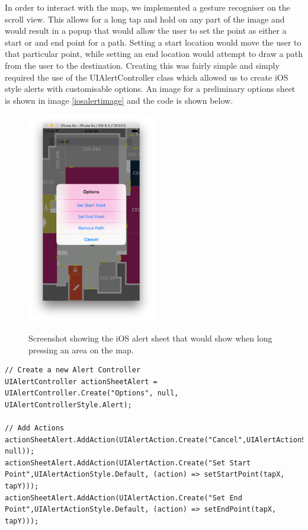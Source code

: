 \documentclass[main.tex]{subfiles}
\begin{document}
In order to interact with the map, we implemented a gesture recogniser on the scroll view. This allows for a long tap and hold on any part of the image and would result in a popup that would allow the user to set the point as either a start or and end point for a path. Setting a start location would move the user to that particular point, while setting an end location would attempt to draw a path from the user to the destination. Creating this was fairly simple and simply required the use of the UIAlertController class which allowed us to create iOS style alerts with customisable options. An image for a preliminary options sheet is shown in image \ref{iosalertimage} and the code is shown below.

\begin{figure}[H]
\centering
\includegraphics[width=0.5\textwidth]{images-implementation/IOSAlertSheet.png}
\label{IOSAlertSheet}
\caption{Screenshot showing the iOS alert sheet that would show when long pressing an area on the map.}
\end{figure}

\begin{lstlisting}
// Create a new Alert Controller
UIAlertController actionSheetAlert = UIAlertController.Create("Options", null, UIAlertControllerStyle.Alert);

// Add Actions
actionSheetAlert.AddAction(UIAlertAction.Create("Cancel",UIAlertActionStyle.Cancel, null));
actionSheetAlert.AddAction(UIAlertAction.Create("Set Start Point",UIAlertActionStyle.Default, (action) => setStartPoint(tapX, tapY)));
actionSheetAlert.AddAction(UIAlertAction.Create("Set End Point",UIAlertActionStyle.Default, (action) => setEndPoint(tapX, tapY)));
\end{lstlisting}
\end{document}
